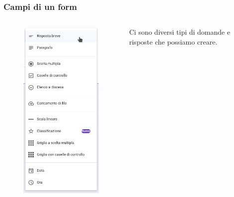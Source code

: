 \documentclass[]{beamer}
\begin{document}
\begin{frame}
\frametitle{Campi di un form}
\begin{columns}
  \begin{column}{.3\textwidth}
    \begin{figure}
      \includegraphics[width=\columnwidth]{img/form3.png}
    \end{figure}
  \end{column}
  \begin{column}{.65\textwidth}
    Ci sono diversi tipi di domande e risposte che possiamo creare.\pause


\end{column}
\end{columns}
\end{frame}
\end{document}
